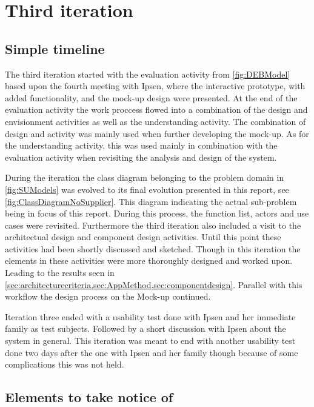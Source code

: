 \section{Third iteration}
\subsection{Simple timeline}\label{sec:3Iteration-timeline}
The third iteration started with the evaluation activity from \cref{fig:DEBModel} based upon the fourth meeting with Ipsen, where the interactive prototype, with added functionality, and the mock-up design were presented.
At the end of the evaluation activity the work proccess flowed into a combination of the design and envisionment activities as well as the understanding activity.
The combination of design and activity was mainly used when further developing the mock-up.
As for the understanding activity, this was used mainly in combination with the evaluation activity when revisiting the analysis and design of the system.

During the iteration the class diagram belonging to the problem domain in \cref{fig:SUModels} was evolved to its final evolution presented in this report, see \cref{fig:ClassDiagramNoSupplier}.
This diagram indicating the actual sub-problem being in focus of this report.
During this process, the function list, actors and use cases were revisited.
Furthermore the third iteration also included a visit to the architectual design and component design activities.
Until this point these activities had been shortly discussed and sketched.
Though in this iteration the elements in these activities were more thoroughly designed and worked upon.
Leading to the results seen in \cref{sec:architecturecriteria,sec:AppMethod,sec:componentdesign}.
Parallel with this workflow the design process on the Mock-up continued.

Iteration three ended with a usability test done with Ipsen and her immediate family as test subjects.
Followed by a short discussion with Ipsen about the system in general.
This iteration was meant to end with another usability test done two days after the one with Ipsen and her family though because of some complications this was not held.

\subsection{Elements to take notice of}

